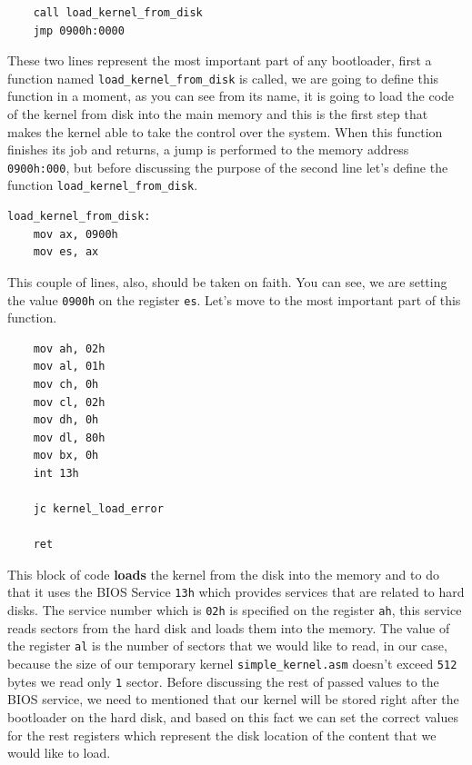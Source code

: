 \begin{lstlisting}
    call load_kernel_from_disk
    jmp 0900h:0000
\end{lstlisting}

These two lines represent the most important part of any bootloader,
first a function named \lstinline!load_kernel_from_disk! is called, we
are going to define this function in a moment, as you can see from its
name, it is going to load the code of the kernel from disk into the main
memory and this is the first step that makes the kernel able to take the
control over the system. When this function finishes its job and
returns, a jump is performed to the memory address
\lstinline!0900h:000!, but before discussing the purpose of the second
line let's define the function \lstinline!load_kernel_from_disk!.

\begin{lstlisting}
load_kernel_from_disk:
    mov ax, 0900h
    mov es, ax
\end{lstlisting}

This couple of lines, also, should be taken on faith. You can see, we
are setting the value \lstinline!0900h! on the register \lstinline!es!.
Let's move to the most important part of this function.

\begin{lstlisting}
    mov ah, 02h
    mov al, 01h
    mov ch, 0h
    mov cl, 02h
    mov dh, 0h
    mov dl, 80h
    mov bx, 0h
    int 13h
    
    jc kernel_load_error

    ret
\end{lstlisting}

This block of code \textbf{loads} the kernel from the disk into the
memory and to do that it uses the BIOS Service \lstinline!13h! which
provides services that are related to hard disks. The service number
which is \lstinline!02h! is specified on the register \lstinline!ah!,
this service reads sectors from the hard disk and loads them into the
memory. The value of the register \lstinline!al! is the number of
sectors that we would like to read, in our case, because the size of our
temporary kernel \lstinline!simple_kernel.asm! doesn't exceed
\lstinline!512! bytes we read only \lstinline!1! sector. Before
discussing the rest of passed values to the BIOS service, we need to
mentioned that our kernel will be stored right after the bootloader on
the hard disk, and based on this fact we can set the correct values for
the rest registers which represent the disk location of the content that
we would like to load.

